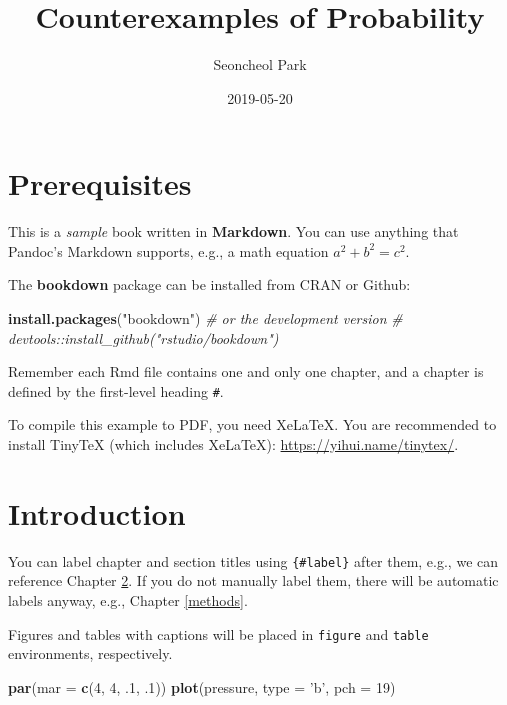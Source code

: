 \documentclass[
  b5paper,
]{scrbook}
\title{Counterexamples of Probability}
\author{Seoncheol Park}
\date{2019-05-20}
\newenvironment{Shaded}{\begin{snugshade}}{\end{snugshade}}
\newcommand{\CommentTok}[1]{\textcolor[rgb]{0.56,0.35,0.01}{\textit{#1}}}
\newcommand{\DataTypeTok}[1]{\textcolor[rgb]{0.13,0.29,0.53}{#1}}
\newcommand{\DecValTok}[1]{\textcolor[rgb]{0.00,0.00,0.81}{#1}}
\newcommand{\FloatTok}[1]{\textcolor[rgb]{0.00,0.00,0.81}{#1}}
\newcommand{\KeywordTok}[1]{\textcolor[rgb]{0.13,0.29,0.53}{\textbf{#1}}}
\newcommand{\NormalTok}[1]{#1}
\newcommand{\StringTok}[1]{\textcolor[rgb]{0.31,0.60,0.02}{#1}}
\theoremstyle{definition}
\theoremstyle{definition}
\theoremstyle{definition}
\theoremstyle{remark}
\begin{document}
\frontmatter
\maketitle

{
\hypersetup{linkcolor=Black}
\setcounter{tocdepth}{2}
\tableofcontents
}
\mainmatter
\hypertarget{prerequisites}{%
\chapter{Prerequisites}\label{prerequisites}}

This is a \emph{sample} book written in \textbf{Markdown}. You can use anything that Pandoc's Markdown supports, e.g., a math equation \(a^2 + b^2 = c^2\).

The \textbf{bookdown} package can be installed from CRAN or Github:

\begin{Shaded}
\begin{Highlighting}[]
\KeywordTok{install.packages}\NormalTok{(}\StringTok{"bookdown"}\NormalTok{)}
\CommentTok{# or the development version}
\CommentTok{# devtools::install_github("rstudio/bookdown")}
\end{Highlighting}
\end{Shaded}

Remember each Rmd file contains one and only one chapter, and a chapter is defined by the first-level heading \texttt{\#}.

To compile this example to PDF, you need XeLaTeX. You are recommended to install TinyTeX (which includes XeLaTeX): \url{https://yihui.name/tinytex/}.

\hypertarget{intro}{%
\chapter{Introduction}\label{intro}}

You can label chapter and section titles using \texttt{\{\#label\}} after them, e.g., we can reference Chapter \ref{intro}. If you do not manually label them, there will be automatic labels anyway, e.g., Chapter \ref{methods}.

Figures and tables with captions will be placed in \texttt{figure} and \texttt{table} environments, respectively.

\begin{Shaded}
\begin{Highlighting}[]
\KeywordTok{par}\NormalTok{(}\DataTypeTok{mar =} \KeywordTok{c}\NormalTok{(}\DecValTok{4}\NormalTok{, }\DecValTok{4}\NormalTok{, }\FloatTok{.1}\NormalTok{, }\FloatTok{.1}\NormalTok{))}
\KeywordTok{plot}\NormalTok{(pressure, }\DataTypeTok{type =} \StringTok{'b'}\NormalTok{, }\DataTypeTok{pch =} \DecValTok{19}\NormalTok{)}
\end{Highlighting}
\end{Shaded}
\end{document}
